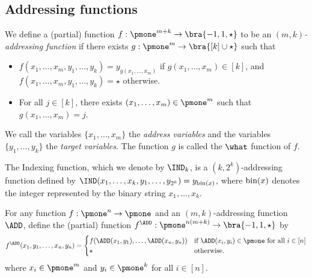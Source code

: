 \subsection{Addressing functions}
\begin{definition}\label{defn: add}
We define a (partial) function $f:\pmone^{m+k} \rightarrow \bra{-1, 1, \star}$ to be an \emph{$(m,k)$-addressing function} if there exists $g : \pmone^m \to \bra{[k] \cup \star}$ such that 
\begin{itemize}
    \item $f(x_1, \dots, x_m, y_1, \dots, y_{k}) = y_{g(x_1, \dots, x_m)}$ if $g(x_1, \dots, x_m) \in [k]$, and $f(x_1, \dots, x_m, y_1, \dots, y_{k}) = \star$ otherwise.
    \item For all $j \in [k]$, there exists $(x_1, \dots, x_m) \in \pmone^m$ such that $g(x_1, \dots, x_m) = j$.
\end{itemize}

We call the variables $\{x_1, \dots, x_m\}$ the \emph{address variables} and the variables $\{y_{1}, \dots, y_{k}\}$ the \emph{target variables}.  The function $g$ is called the $\what$ function of $f$.
\end{definition}

\begin{definition}
The Indexing function, which we denote by $\IND_k$, is a $(k, 2^k)$-addressing function defined by $\IND(x_1, \dots, x_k, y_1, \dots, y_{2^k}) = y_{\textnormal{bin}(x)}$, where $\textnormal{bin}(x)$ denotes the integer represented by the binary string $x_1, \dots, x_k$.
\end{definition}

\begin{definition}\label{defn: addcomp}
For any function $f : \pmone^n \to \pmone$ and an $(m, k)$-addressing function $\ADD$, define the (partial) function $f^{\ADD} : \pmone^{n (m + k)} \to \bra{-1, 1, \star}$ by
\[
f^{\ADD}(x_1, y_1, \dots, x_n, y_n) = 
\begin{cases}
f(\ADD(x_1, y_1), \dots, \ADD(x_n, y_n)) & \text{if~} \ADD(x_i, y_i) \in \pmone \text{~for all~} i \in [n]\\
\star & \text{otherwise}.
\end{cases}
\]
where $x_i \in \pmone^{m}$ and $y_i \in \pmone^k$ for all $i \in [n]$.
\end{definition}

